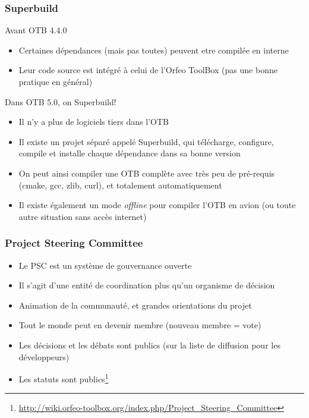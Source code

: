 \documentclass[8pt]{beamer}
\begin{document}
\begin{frame}
\frametitle{Superbuild}
\begin{block}{Avant OTB 4.4.0}
\begin{itemize}
\item Certaines dépendances (mais pas toutes) peuvent etre compilée en interne
\item Leur code source est intégré à celui de l'Orfeo ToolBox (pas une bonne pratique en général)
\end{itemize}
\end{block}

\begin{block}{Dans OTB 5.0, on Superbuild!}
\begin{itemize}
\item Il n'y a plus de logiciels tiers dans l'OTB
\item Il existe un projet séparé appelé Superbuild, qui télécharge, configure, compile et installe chaque dépendance dans sa bonne version
\item On peut ainsi compiler une OTB complète avec très peu de pré-requis (cmake, gcc, zlib, curl), et totalement automatiquement
\item Il existe également un mode \textit{offline} pour compiler l'OTB en avion (ou toute autre situation sans accès internet)
\end{itemize}
\end{block}
\end{frame}

\begin{frame}
\frametitle{Project Steering Committee}
\begin{itemize}
\item Le PSC est un système de gouvernance ouverte
\item Il s'agit d'une entité de coordination plus qu'un organisme de décision
\item Animation de la communauté, et grandes orientations du projet
\item Tout le monde peut en devenir membre (nouveau membre = vote)
\item Les décisions et les débats sont publics (sur la liste de diffusion pour les développeurs)
\item Les statuts sont publics\footnote{\url{http://wiki.orfeo-toolbox.org/index.php/Project_Steering_Committee}}
\end{itemize}
\end{frame}
\end{document}
